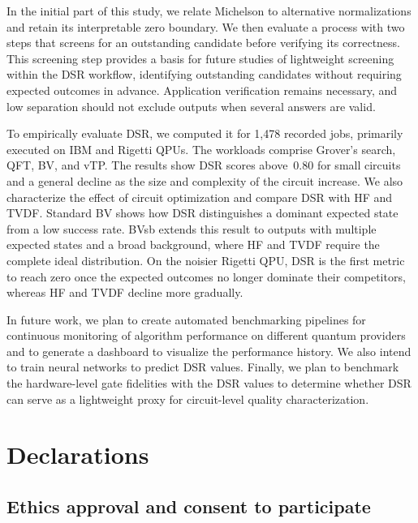 \documentclass[pdflatex,sn-mathphys-num]{sn-jnl}
\theoremstyle{thmstyleone}%
\theoremstyle{thmstyletwo}%
\theoremstyle{thmstylethree}%
\begin{document}
In the initial part of this study, we relate Michelson to alternative normalizations and retain its interpretable zero boundary. We then evaluate a process with two steps that screens for an outstanding candidate before verifying its correctness. This screening step provides a basis for future studies of lightweight screening within the DSR workflow, identifying outstanding candidates without requiring expected outcomes in advance. Application verification remains necessary, and low separation should not exclude outputs when several answers are valid.

To empirically evaluate DSR, we computed it for 1{,}478 recorded jobs, primarily executed on IBM and Rigetti QPUs. The workloads comprise Grover's search, QFT, BV, and vTP. The results show DSR scores above~$0.80$ for small circuits and a general decline as the size and complexity of the circuit increase. We also characterize the effect of circuit optimization and compare DSR with HF and TVDF. Standard BV shows how DSR distinguishes a dominant expected state from a low success rate. BVsb extends this result to outputs with multiple expected states and a broad background, where HF and TVDF require the complete ideal distribution. On the noisier Rigetti QPU, DSR is the first metric to reach zero once the expected outcomes no longer dominate their competitors, whereas HF and TVDF decline more gradually.

In future work, we plan to create automated benchmarking pipelines for continuous monitoring of algorithm performance on different quantum providers and to generate a dashboard to visualize the performance history. We also intend to train neural networks to predict DSR values. Finally, we plan to benchmark the hardware-level gate fidelities with the DSR values to determine whether DSR can serve as a lightweight proxy for circuit-level quality characterization.

\FloatBarrier
\backmatter

\section*{Declarations}

\subsection*{Ethics approval and consent to participate}
\end{document}
